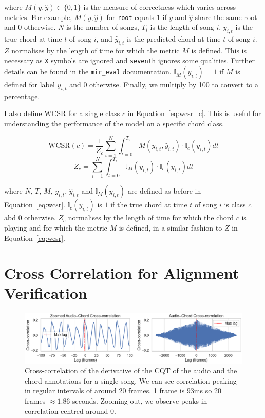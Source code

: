 where $M(y, \hat{y})\in\{0,1\}$ is the measure of correctness which varies across metrics. For example, $M(y, \hat{y})$ for \texttt{root} equals $1$ if $y$ and $\hat{y}$ share the same root and $0$ otherwise. $N$ is the number of songs, $T_i$ is the length of song $i$, $y_{i,t}$ is the true chord at time $t$ of song $i$, and $\hat{y}_{i,t}$ is the predicted chord at time $t$ of song $i$. $Z$ normalises by the length of time for which the metric $M$ is defined. This is necessary as \texttt{X} symbols are ignored and \texttt{seventh} ignores some qualities. Further details can be found in the \texttt{mir\_eval} documentation. $\mathbb{I}_M(y_{i,t})=1$ if $M$ is defined for label $y_{i,t}$ and $0$ otherwise. Finally, we multiply by 100 to convert to a percentage.

I also define WCSR for a single class $c$ in Equation~\ref{eq:wcsr_c}. This is useful for understanding the performance of the model on a specific chord class.

\begin{equation}\label{eq:wcsr_c}
    \text{WCSR}(c) = \frac{1}{Z_c}\sum_{i=1}^{N} \int_{t=0}^{T_i} M(y_{i,t},\hat{y}_{i,t}) \cdot \mathbb{I}_c(y_{i,t}) dt
\end{equation}
\begin{equation}
    Z_c = \sum_{i=1}^{N} \int_{t=0}^{T_i} \mathbb{I}_M(y_{i,t})\cdot \mathbb{I}_c(y_{i,t}) dt
\end{equation}

where $N$, $T$, $M$, $y_{i,t}$, $\hat{y}_{i,t}$ and $\mathbb{I}_M(y_{i,t})$ are defined as before in Equation~\ref{eq:wcsr}. $\mathbb{I}_c(y_{i,t})$ is $1$ if the true chord at time $t$ of song $i$ is class $c$ abd $0$ otherwise. $Z_c$ normalises by the length of time for which the chord $c$ is playing and for which the metric $M$ is defined, in a similar fashion to $Z$ in Equation~\ref{eq:wcsr}.

\section{Cross Correlation for Alignment Verification}\label{app:cross_correlation}

\begin{figure}[H]
    \centering
    \includegraphics[width=1.0\textwidth]{figures/cross_correlation.png}
    \caption{Cross-correlation of the derivative of the CQT of the audio and the chord annotations for a single song. We can see correlation peaking in regular intervals of around 20 frames. 1 frame is $93$ms so 20 frames $\approx 1.86$ seconds. Zooming out, we observe peaks in correlation centred around 0.}\label{fig:cross-correlation}
\end{figure}


